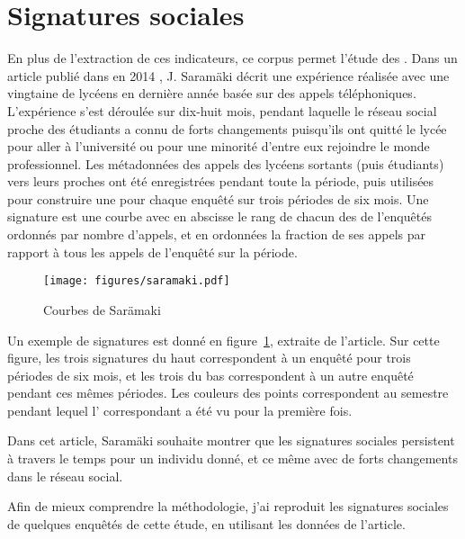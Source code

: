
\section{Signatures sociales}

En plus de l’extraction de ces indicateurs, ce corpus permet l’étude des
. Dans un article publié dans \pnas{} en 2014
\citep{Saramaki2014}, J. Saram\"aki décrit une expérience réalisée avec une
vingtaine de lycéens en dernière année basée sur des appels téléphoniques.
L’expérience s’est déroulée sur dix-huit mois, pendant laquelle le réseau
social proche des étudiants a connu de forts changements puisqu’ils ont quitté
le lycée pour aller à l’université \citep{Paul2001} ou pour une minorité
d’entre eux rejoindre le monde professionnel. Les métadonnées des appels des
lycéens sortants (puis étudiants) vers leurs proches ont été enregistrées
pendant toute la période, puis utilisées pour construire une  pour chaque enquêté sur trois périodes de six mois. Une signature est
une courbe avec en abscisse le rang de chacun des  de l’enquêtés
ordonnés par nombre d’appels, et en ordonnées la fraction de ses appels par
rapport à tous les appels de l’enquêté sur la période.

\begin{figure}[ht]
    \begin{center}
        \texttt{[image: figures/saramaki.pdf]}
    \end{center}
    \caption{\label{fig:saramaki}Courbes de Sar\"amaki}
\end{figure}

Un exemple de signatures est donné en figure~\ref{fig:saramaki}, extraite de
l’article. Sur cette figure, les trois signatures du haut correspondent à un
enquêté pour trois périodes de six mois, et les trois du bas correspondent à un
autre enquêté pendant ces mêmes périodes. Les couleurs des points correspondent
au semestre pendant lequel l’ correspondant a été vu pour la première
fois.

Dans cet article, Saram\"aki souhaite montrer que les signatures sociales
persistent à travers le temps pour un individu donné, et ce même avec de forts
changements dans le réseau social.

Afin de mieux comprendre la méthodologie, j’ai reproduit les signatures
sociales de quelques enquêtés de cette étude, en utilisant les données de
l’article.

